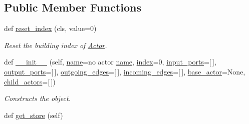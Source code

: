 \subsection*{Public Member Functions}
\begin{DoxyCompactItemize}
\item 
def \hyperlink{classsylva_1_1base_1_1sdf_1_1_actor_a944374756e18d763022664b8bc26d77f}{reset\+\_\+index} (cls, value=0)
\begin{DoxyCompactList}\small\item\em Reset the building index of \hyperlink{classsylva_1_1base_1_1sdf_1_1_actor}{Actor}. \end{DoxyCompactList}\item 
def \hyperlink{classsylva_1_1base_1_1sdf_1_1_actor_a4351fa2189135a2c4eee007a715c60f3}{\+\_\+\+\_\+init\+\_\+\+\_\+} (self, \hyperlink{classsylva_1_1base_1_1sdf_1_1_actor_a76ca02f41b3d1fae9d3df33f94f2fcdf}{name}=\textquotesingle{}no actor \hyperlink{classsylva_1_1base_1_1sdf_1_1_actor_a76ca02f41b3d1fae9d3df33f94f2fcdf}{name}\textquotesingle{}, \hyperlink{classsylva_1_1base_1_1sdf_1_1_actor_adb41a566fbf747a585a1c961a011a1cf}{index}=0, \hyperlink{classsylva_1_1base_1_1sdf_1_1_actor_a00ccb05f3effbe2ec4bef76dd04f387d}{input\+\_\+ports}=\mbox{[}$\,$\mbox{]}, \hyperlink{classsylva_1_1base_1_1sdf_1_1_actor_ac7e5ac2deece32b06b58a499a5dd0fee}{output\+\_\+ports}=\mbox{[}$\,$\mbox{]}, \hyperlink{classsylva_1_1base_1_1sdf_1_1_actor_a11fdbcea1b73039bad4996f5380277d8}{outgoing\+\_\+edges}=\mbox{[}$\,$\mbox{]}, \hyperlink{classsylva_1_1base_1_1sdf_1_1_actor_a369e42539c2f6dbefafd3ab543428404}{incoming\+\_\+edges}=\mbox{[}$\,$\mbox{]}, \hyperlink{classsylva_1_1base_1_1sdf_1_1_actor_ac5ef898588204ab1eb4a8ac68fa5fd71}{base\+\_\+actor}=None, \hyperlink{classsylva_1_1base_1_1sdf_1_1_actor_a401878079b1860ed686c9e147f37a84b}{child\+\_\+actors}=\mbox{[}$\,$\mbox{]})
\begin{DoxyCompactList}\small\item\em Constructs the object. \end{DoxyCompactList}\item 
def \hyperlink{classsylva_1_1base_1_1sdf_1_1_actor_a34ae46010635867a769f6907b46697d0}{get\+\_\+store} (self)
\end{DoxyCompactItemize}
